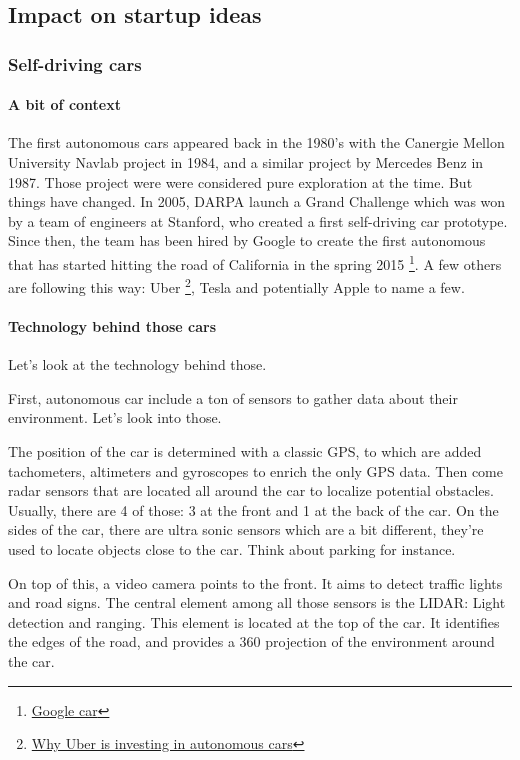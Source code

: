 \documentclass[12pt]{article}
\begin{document}
\subsection{Impact on startup ideas}

\subsubsection{Self-driving cars}

\paragraph{A bit of context}

The first autonomous cars appeared back in the 1980's with the Canergie Mellon
University Navlab project in 1984, and a similar project by Mercedes Benz in
1987. Those project were were considered pure exploration at the time.
But things have changed. In 2005, DARPA launch a Grand Challenge which was won
by a team of engineers at Stanford, who created a first self-driving car
prototype. Since then, the team has been hired by Google to create the first
autonomous that has started hitting the road of California in the spring 2015 \footnote{\href{http://www.google.com/selfdrivingcar/}
{Google car}}.
A few others are following this way: Uber \footnote{\href{http://www.businessinsider.com/why-uber-is-investing-in-autonomous-cars-2015-8?IR=T}
{Why Uber is investing in autonomous cars}}, Tesla and potentially Apple to name
a few.

\paragraph{Technology behind those cars}

Let's look at the technology behind those.

First, autonomous car include a ton of sensors to gather data about their
environment. Let's look into those.

The position of the car is determined with a classic GPS, to which are added
tachometers, altimeters and gyroscopes to enrich the only GPS data. Then come
radar sensors that are located all around the car to localize potential
obstacles. Usually, there are 4 of those: 3 at the front and 1 at the back of
the car. On the sides of the car, there are ultra sonic sensors which are a bit
different, they're used to locate objects close to the car. Think about parking
for instance.

\noindent On top of this, a video camera points to the front. It aims to detect
traffic lights and road signs. The central element among all those sensors is
the LIDAR: Light detection and ranging. This element is located at the top of
the car. It identifies the edges of the road, and provides a 360 projection of
the environment around the car.
\end{document}
